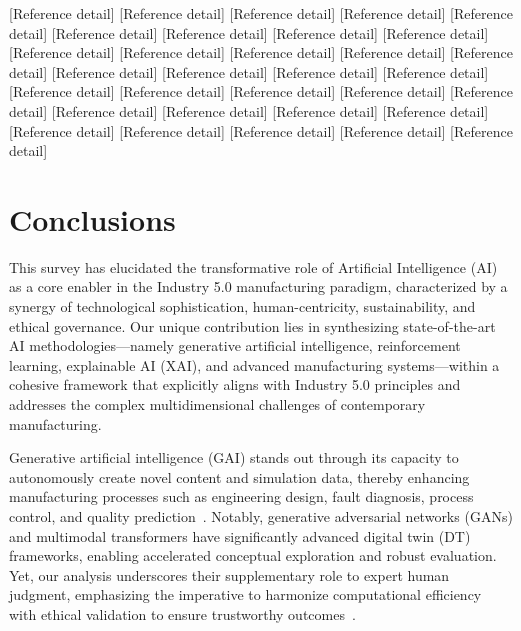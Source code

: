 \documentclass[sigconf]{acmart}
\begin{document}
\begin{thebibliography}{}

 [Reference detail]
 [Reference detail]
 [Reference detail]
 [Reference detail]
 [Reference detail]
 [Reference detail]
 [Reference detail]
 [Reference detail]
 [Reference detail]
 [Reference detail]
 [Reference detail]
 [Reference detail]
 [Reference detail]
 [Reference detail]
 [Reference detail]
 [Reference detail]
 [Reference detail]
 [Reference detail]
 [Reference detail]
 [Reference detail]
 [Reference detail]
 [Reference detail]
 [Reference detail]
 [Reference detail]
 [Reference detail]
 [Reference detail]
 [Reference detail]
 [Reference detail]
 [Reference detail]
 [Reference detail]
 [Reference detail]
 [Reference detail]

\end{thebibliography}

\section{Conclusions}

This survey has elucidated the transformative role of Artificial Intelligence (AI) as a core enabler in the Industry 5.0 manufacturing paradigm, characterized by a synergy of technological sophistication, human-centricity, sustainability, and ethical governance. Our unique contribution lies in synthesizing state-of-the-art AI methodologies—namely generative artificial intelligence, reinforcement learning, explainable AI (XAI), and advanced manufacturing systems—within a cohesive framework that explicitly aligns with Industry 5.0 principles and addresses the complex multidimensional challenges of contemporary manufacturing.

Generative artificial intelligence (GAI) stands out through its capacity to autonomously create novel content and simulation data, thereby enhancing manufacturing processes such as engineering design, fault diagnosis, process control, and quality prediction~\cite{ref1,ref5,ref24}. Notably, generative adversarial networks (GANs) and multimodal transformers have significantly advanced digital twin (DT) frameworks, enabling accelerated conceptual exploration and robust evaluation. Yet, our analysis underscores their supplementary role to expert human judgment, emphasizing the imperative to harmonize computational efficiency with ethical validation to ensure trustworthy outcomes~\cite{ref2,ref6,ref14}.
\end{document}
